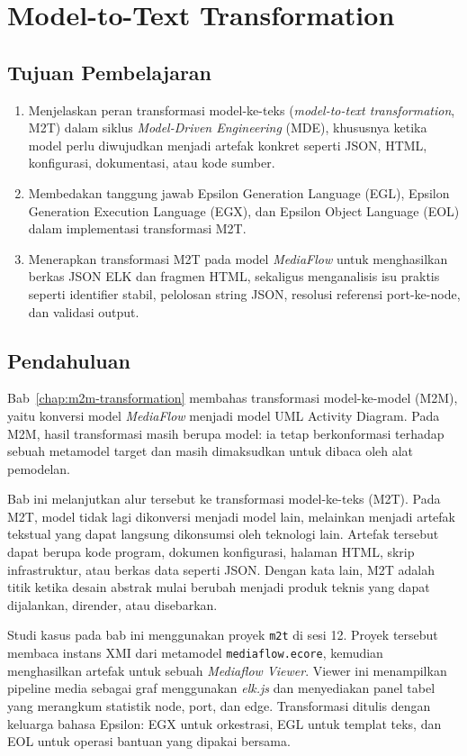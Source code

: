 \chapter{Model-to-Text Transformation}
\label{chap:m2t-transformation}

\section*{Tujuan Pembelajaran}
\begin{enumerate}
  \item Menjelaskan peran transformasi model-ke-teks (\textit{model-to-text transformation}, M2T) dalam siklus \textit{Model-Driven Engineering} (MDE), khususnya ketika model perlu diwujudkan menjadi artefak konkret seperti JSON, HTML, konfigurasi, dokumentasi, atau kode sumber.
  \item Membedakan tanggung jawab Epsilon Generation Language (EGL), Epsilon Generation Execution Language (EGX), dan Epsilon Object Language (EOL) dalam implementasi transformasi M2T.
  \item Menerapkan transformasi M2T pada model \textit{MediaFlow} untuk menghasilkan berkas JSON ELK dan fragmen HTML, sekaligus menganalisis isu praktis seperti identifier stabil, pelolosan string JSON, resolusi referensi port-ke-node, dan validasi output.
\end{enumerate}

\section{Pendahuluan}

Bab~\ref{chap:m2m-transformation} membahas transformasi model-ke-model (M2M), yaitu konversi model \textit{MediaFlow} menjadi model UML Activity Diagram. Pada M2M, hasil transformasi masih berupa model: ia tetap berkonformasi terhadap sebuah metamodel target dan masih dimaksudkan untuk dibaca oleh alat pemodelan.

Bab ini melanjutkan alur tersebut ke transformasi model-ke-teks (M2T). Pada M2T, model tidak lagi dikonversi menjadi model lain, melainkan menjadi artefak tekstual yang dapat langsung dikonsumsi oleh teknologi lain. Artefak tersebut dapat berupa kode program, dokumen konfigurasi, halaman HTML, skrip infrastruktur, atau berkas data seperti JSON. Dengan kata lain, M2T adalah titik ketika desain abstrak mulai berubah menjadi produk teknis yang dapat dijalankan, dirender, atau disebarkan.

Studi kasus pada bab ini menggunakan proyek \texttt{m2t} di sesi 12. Proyek tersebut membaca instans XMI dari metamodel \texttt{mediaflow.ecore}, kemudian menghasilkan artefak untuk sebuah \textit{Mediaflow Viewer}. Viewer ini menampilkan pipeline media sebagai graf menggunakan \textit{elk.js} dan menyediakan panel tabel yang merangkum statistik node, port, dan edge. Transformasi ditulis dengan keluarga bahasa Epsilon: EGX untuk orkestrasi, EGL untuk templat teks, dan EOL untuk operasi bantuan yang dipakai bersama.

